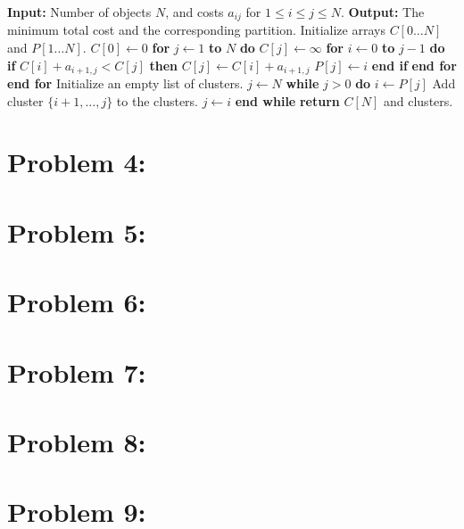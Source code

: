 \documentclass[11pt, a4paper, oneside]{memoir}
\begin{document}
\begin{algorithm}[H]
  \caption{Optimal Clustering DP}
  \label{alg:clustering}
  \begin{algorithmic}[1]
  \STATE \textbf{Input:} Number of objects $N$, and costs $a_{ij}$ for $1 \le i \le j \le N$.
  \STATE \textbf{Output:} The minimum total cost and the corresponding partition.
  \STATE Initialize arrays $C[0 \dots N]$ and $P[1 \dots N]$.
  \STATE $C[0] \leftarrow 0$
  \STATE \textbf{for} $j \leftarrow 1$ \textbf{to} $N$ \textbf{do}
  \STATE \quad $C[j] \leftarrow \infty$
  \STATE \quad \textbf{for} $i \leftarrow 0$ \textbf{to} $j-1$ \textbf{do}
  \STATE \quad \quad \textbf{if} $C[i] + a_{i+1, j} < C[j]$ \textbf{then}
  \STATE \quad \quad \quad $C[j] \leftarrow C[i] + a_{i+1, j}$
  \STATE \quad \quad \quad $P[j] \leftarrow i$
  \STATE \quad \quad \textbf{end if}
  \STATE \quad \textbf{end for}
  \STATE \textbf{end for}
  \STATE {}
  \STATE Initialize an empty list of clusters.
  \STATE $j \leftarrow N$
  \STATE \textbf{while} $j > 0$ \textbf{do}
  \STATE \quad $i \leftarrow P[j]$
  \STATE \quad Add cluster $\{i+1, \dots, j\}$ to the clusters.
  \STATE \quad $j \leftarrow i$
  \STATE \textbf{end while}
  \STATE \textbf{return} $C[N]$ and clusters.
  \end{algorithmic}
\end{algorithm}

\chapter{Problem 4: ~}

\chapter{Problem 5: ~}

\chapter{Problem 6: ~}

\chapter{Problem 7: ~}

\chapter{Problem 8: ~}

\chapter{Problem 9: ~}
\label{LastPage}
\end{document}
